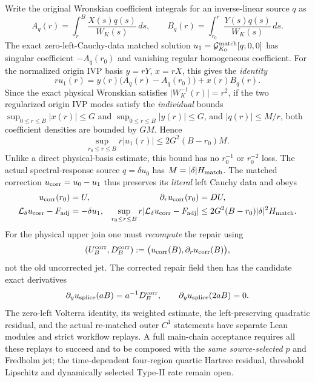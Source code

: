 \documentclass[11pt]{amsart}
\begin{document}
Write the original Wronskian coefficient integrals for an
inverse-linear source \(q\) as
\[
 A_q(r)=\int_r^B \frac{X(s)q(s)}{W_K(s)}\,ds,\qquad
 B_q(r)=\int_{r_0}^r\frac{Y(s)q(s)}{W_K(s)}\,ds .
\]
The exact zero-left-Cauchy-data matched solution
\(u_1=\mathcal G^{\rm match}_{K_0}[q;0,0]\)
has singular coefficient \(-A_q(r_0)\) and vanishing
regular homogeneous coefficient. For the normalized origin
IVP basis \(y=rY\), \(x=rX\), this gives the \emph{identity}
\[
 \boxed{r u_1(r)=
  y(r)\bigl(A_q(r)-A_q(r_0)\bigr)+x(r) B_q(r).}
\]
Since the exact physical Wronskian satisfies
\(\lvert W_K^{-1}(r)\rvert=r^2\), if the two
regularized origin IVP modes satisfy the \emph{individual} bounds
\(\sup_{0\le r\le B}|x(r)|\le G\) and
\(\sup_{0\le r\le B}|y(r)|\le G\), and
\(|q(r)|\le M/r\), both coefficient densities are bounded by
\(GM\). Hence
\begin{equation}
 \sup_{r_0\le r\le B}r|u_1(r)|
 \le 2G^2(B-r_0)M .
 \label{eq:hbl-original-zero-left-volterra-weighted}
\end{equation}
Unlike a direct physical-basis estimate, this bound has no
\(r_0^{-1}\) or \(r_0^{-2}\) loss. The actual spectral-response
source \(q=\delta u_0\) has \(M=|\delta|H_{\rm match}\).
The matched correction \(u_{\rm corr}=u_0-u_1\)
thus preserves its \emph{literal} left Cauchy data and obeys
\[
 \begin{aligned}
 u_{\rm corr}(r_0)&=U,&
 \partial_r u_{\rm corr}(r_0)&=DU,\\
 \mathcal L_\delta u_{\rm corr}-F_{\rm adj}
   &=-\delta u_1,&
 \sup_{r_0\le r\le B}
 r|\mathcal L_\delta u_{\rm corr}-F_{\rm adj}|
   &\le 2G^2(B-r_0)|\delta|^2H_{\rm match}.
 \end{aligned}
\]
For the physical upper join one must \emph{recompute} the repair
using
\[
 (U_B^{\rm corr},D_B^{\rm corr})
  :=\bigl(u_{\rm corr}(B),\partial_r u_{\rm corr}(B)\bigr),
\]
not the old uncorrected jet. The corrected repair field then has
the candidate exact derivatives
\[
 \partial_yu_{\rm splice}(aB)
  =a^{-1}D_B^{\rm corr},\qquad
 \partial_yu_{\rm splice}(2aB)=0.
\]
The zero-left Volterra identity, its weighted estimate, the
left-preserving quadratic residual, and the actual re-matched
outer \(C^1\) statements have separate Lean modules and
strict workflow replays. A full main-chain acceptance requires
all these replays to succeed and to be composed with the
\emph{same source-selected} \(p\) and Fredholm jet; the
time-dependent four-region quartic Hartree residual, threshold
Lipschitz and dynamically selected Type-II rate remain open.
\end{document}
